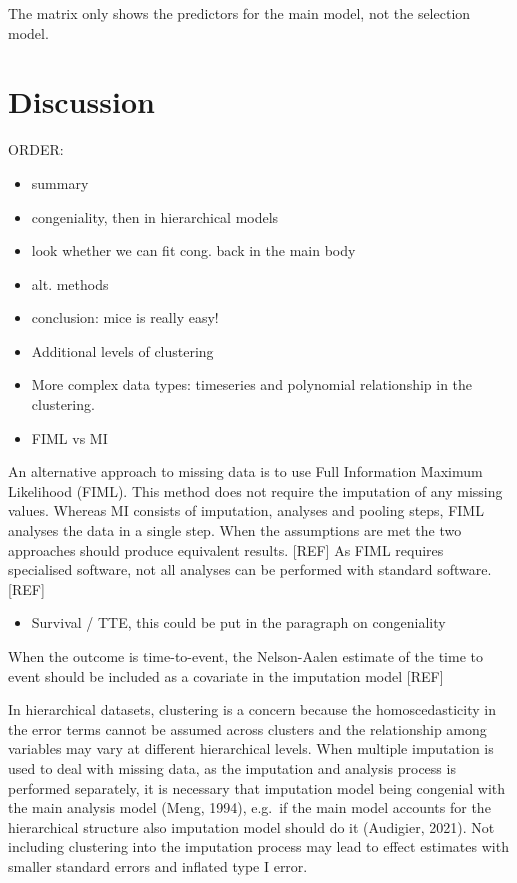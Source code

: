 \documentclass[
]{jss}
\providecommand{\tightlist}{%
  \setlength{\itemsep}{0pt}\setlength{\parskip}{0pt}}
\begin{document}
The matrix only shows the predictors for the main model, not the
selection model.

\hypertarget{discussion}{%
\section{Discussion}\label{discussion}}

ORDER:

\begin{itemize}
\item
  summary
\item
  congeniality, then in hierarchical models
\item
  look whether we can fit cong. back in the main body
\item
  alt. methods
\item
  conclusion: mice is really easy!
\item
  Additional levels of clustering
\item
  More complex data types: timeseries and polynomial relationship in the
  clustering.
\item
  FIML vs MI
\end{itemize}

An alternative approach to missing data is to use Full Information
Maximum Likelihood (FIML). This method does not require the imputation
of any missing values. Whereas MI consists of imputation, analyses and
pooling steps, FIML analyses the data in a single step. When the
assumptions are met the two approaches should produce equivalent
results. {[}REF{]} As FIML requires specialised software, not all
analyses can be performed with standard software. {[}REF{]}

\begin{itemize}
\tightlist
\item
  Survival / TTE, this could be put in the paragraph on congeniality
\end{itemize}

When the outcome is time-to-event, the Nelson-Aalen estimate of the time
to event should be included as a covariate in the imputation model
{[}REF{]}

In hierarchical datasets, clustering is a concern because the
homoscedasticity in the error terms cannot be assumed across clusters
and the relationship among variables may vary at different hierarchical
levels. When multiple imputation is used to deal with missing data, as
the imputation and analysis process is performed separately, it is
necessary that imputation model being congenial with the main analysis
model (Meng, 1994), e.g.~if the main model accounts for the hierarchical
structure also imputation model should do it (Audigier, 2021). Not
including clustering into the imputation process may lead to effect
estimates with smaller standard errors and inflated type I error.
\end{document}
